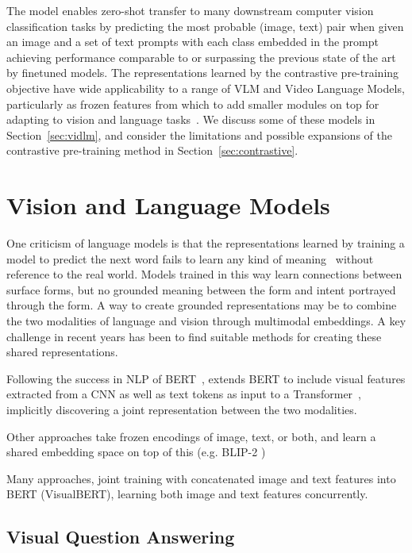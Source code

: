 The model enables zero-shot transfer to many downstream computer vision
classification tasks by predicting the most probable (image, text) pair when
given an image and a set of text prompts with each class embedded in the prompt
achieving performance comparable to or surpassing the previous state of the art
by finetuned models. The representations learned by the contrastive
pre-training objective have wide applicability to a range of VLM and Video
Language Models, particularly as frozen features from which to add smaller
modules on top for adapting to vision and language
tasks~\citep{alayrac2022flamingo,lin2022evl,lei2021clipbert}. We discuss some
of these models in Section~\ref{sec:vidlm}, and consider the limitations and
possible expansions of the contrastive pre-training method
in Section~\ref{sec:contrastive}.


\section{Vision and Language Models}
\label{sec:vlm}

One criticism of language models is that the representations learned by
training a model to predict the next word fails to learn any kind of
meaning~\citep{bender2020climbing} without reference to the real world. Models
trained in this way learn connections between surface forms, but no grounded
meaning between the form and intent portrayed through the form. A way to create
grounded representations may be to combine the two modalities of language and
vision through multimodal embeddings. A key challenge in recent years has been
to find suitable methods for creating these shared representations.

Following the success in NLP of BERT~\citep{devlin2019bert},
\cite{li2019visualbert} extends BERT to include visual features extracted from
a CNN as well as text tokens as input to a
Transformer~\citep{vaswani2017attention}, implicitly discovering a joint
representation between the two modalities. \cite{lu2019vilbert}

Other approaches take frozen encodings of image, text, or both, and learn a
shared embedding space on top of this (e.g. BLIP-2 \cite{li2023blip2})

Many approaches, joint training with concatenated image and text features into
BERT (VisualBERT), learning both image and text features concurrently.


\subsection{Visual Question Answering}
\label{ssec:vqa}

